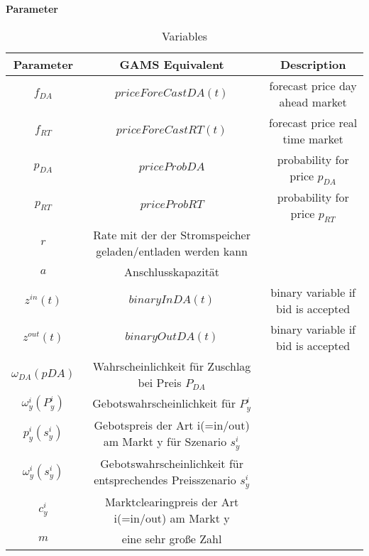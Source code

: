 \textbf{Parameter}
\begin{table}
	\centering
	\begin{tabular}{c|c|c}
		Parameter               & GAMS Equivalent                                                   & Description                        \\
		\hline
		$f_{DA}$                & $priceForeCastDA(t)$                                              & forecast price day ahead market    \\
		$f_{RT}$                & $priceForeCastRT(t)$                                              & forecast price real time market    \\

		$p_{DA}$                & $ priceProbDA $                                                   & probability for price $p_{DA}$     \\
		$p_{RT}$                & $ priceProbRT $                                                   & probability for price $p_{RT}$     \\


		$r$                     & Rate mit der der Stromspeicher geladen/entladen werden kann                                            \\
		$a$                     & Anschlusskapazität                                                                                     \\
		$z^{in}(t)$             & $binaryInDA(t)$                                                   & binary variable if bid is accepted \\
		$z^{out}(t)$            & $binaryOutDA(t)$                                                  & binary variable if bid is accepted \\
		$\omega_{DA}(pDA) $     & Wahrscheinlichkeit für Zuschlag bei Preis $P_{DA}$                                                     \\
		$\omega^i_{y}(P^i_{y})$ & Gebotswahrscheinlichkeit für $P^i_{y}$                                                                 \\
		$p^i_{y}(s^i_y)$        & Gebotspreis der Art i(=in/out) am Markt y für Szenario $s^i_y$                                         \\
		$\omega^i_{y}(s^i_y)$   & Gebotswahrscheinlichkeit für entsprechendes Preisszenario $s^i_y$                                      \\
		$c^i_y$                 & Marktclearingpreis der Art i(=in/out) am Markt y                                                       \\
		$m$                     & eine sehr große Zahl                                                                                   \\
	\end{tabular}
	\caption{Variables}
	\label{tab:my_label}
\end{table}





